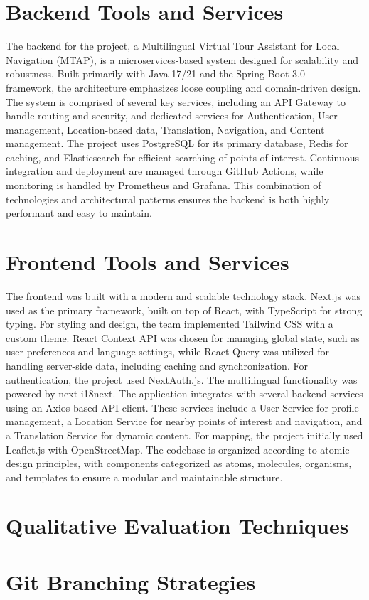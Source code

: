 \section{Backend Tools and Services}
The backend for the project, a Multilingual Virtual Tour Assistant for Local Navigation (MTAP), is a microservices-based system designed for scalability and robustness. Built primarily with Java 17/21 and the Spring Boot 3.0+ framework, the architecture emphasizes loose coupling and domain-driven design. The system is comprised of several key services, including an API Gateway to handle routing and security, and dedicated services for Authentication, User management, Location-based data, Translation, Navigation, and Content management. The project uses PostgreSQL for its primary database, Redis for caching, and Elasticsearch for efficient searching of points of interest. Continuous integration and deployment are managed through GitHub Actions, while monitoring is handled by Prometheus and Grafana. This combination of technologies and architectural patterns ensures the backend is both highly performant and easy to maintain.
    
\section{Frontend Tools and Services}
The frontend was built with a modern and scalable technology stack. Next.js was used as the primary framework, built on top of React, with TypeScript for strong typing. For styling and design, the team implemented Tailwind CSS with a custom theme. 
React Context API was chosen for managing global state, such as user preferences and language settings, while React Query was utilized for handling server-side data, including caching and synchronization. For authentication, the project used NextAuth.js. The multilingual functionality was powered by next-i18next. The application integrates with several backend services using an Axios-based API client. These services include a User Service for profile management, a Location Service for nearby points of interest and navigation, and a Translation Service for dynamic content. For mapping, the project initially used Leaflet.js with OpenStreetMap. The codebase is organized according to atomic design principles, with components categorized as atoms, molecules, organisms, and templates to ensure a modular and maintainable structure.

\section{Qualitative Evaluation Techniques}
        \blindtext

\section{Git Branching Strategies}
        \blindtext
